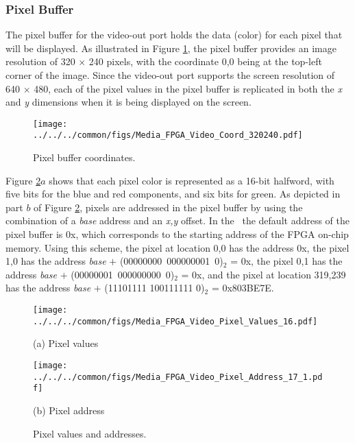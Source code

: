 \subsubsection{Pixel Buffer}
\label{sec:pixel_buffer}

The pixel buffer for the video-out port holds the data (color) for each pixel that
will be displayed.  As illustrated in Figure \ref{fig:video_coord}, the
pixel buffer provides an image resolution of 
320 $\times$ 240 pixels, with the coordinate 0,0 being at the top-left corner of the image. 
Since the video-out port supports the screen resolution of 640 $\times$ 480, each of the
pixel values in
the pixel buffer is replicated in both the {\it x} and {\it y} dimensions when it is being
displayed on the screen.

\begin{figure}[h!]
   \begin{center}
       \texttt{[image: ../../../common/figs/Media\_FPGA\_Video\_Coord\_320240.pdf]}
   \end{center}
   \caption{Pixel buffer coordinates.}
	\label{fig:video_coord}
\end{figure}

Figure \ref{fig:pixels}$a$ shows that each pixel color is represented as a 16-bit halfword, 
with five bits for the blue and red 
components, and six bits for green.  As depicted in part $b$ of Figure \ref{fig:pixels}, 
pixels are addressed in the pixel buffer by 
using the combination of a {\it base} address and an {\it x,y} offset.  In the \systemName~the default
address of the pixel buffer is {\sf 0x}, which corresponds
to the starting address of the FPGA on-chip memory.  Using this scheme, the pixel at 
location 0,0 has the address {\sf 0x}, 
the pixel 1,0 has the address {\it base} $+$ (00000000~000000001~0)$_2$ = {\sf 0x}, 
the pixel 0,1 has the address {\it base} $+$ (00000001~000000000~0)$_2$ = {\sf 0x},
and the pixel at location 319,239 has the address {\it base} $+$ (11101111 100111111 0)$_2$ = 
{\sf 0x\baseAddressOffset 803BE7E}. 

\begin{figure}[h!]
   \begin{center}
       \texttt{[image: ../../../common/figs/Media\_FPGA\_Video\_Pixel\_Values\_16.pdf]}
			 \caption*{(a) Pixel values}
			 \vspace{1cm}
			 \texttt{[image: ../../../common/figs/Media\_FPGA\_Video\_Pixel\_Address\_17\_1.pdf]}
			 \caption*{(b) Pixel address}
   \end{center}
   \caption{Pixel values and addresses.}
	\label{fig:pixels}
\end{figure}

